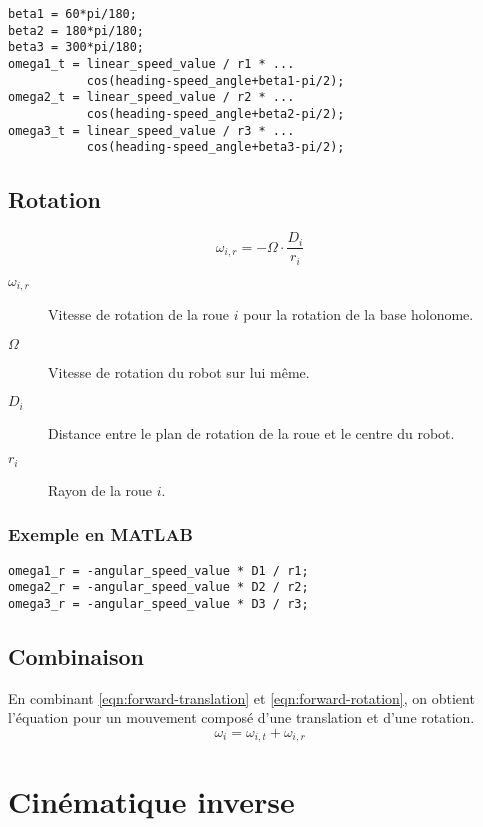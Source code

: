 \documentclass[a4paper]{paper}
\begin{document}
\begin{lstlisting}
beta1 = 60*pi/180;
beta2 = 180*pi/180;
beta3 = 300*pi/180;
omega1_t = linear_speed_value / r1 * ...
           cos(heading-speed_angle+beta1-pi/2);
omega2_t = linear_speed_value / r2 * ...
           cos(heading-speed_angle+beta2-pi/2);
omega3_t = linear_speed_value / r3 * ...
           cos(heading-speed_angle+beta3-pi/2);
\end{lstlisting}

\subsection{Rotation}
\begin{equation}
    \omega_{i, r} = - \Omega \cdot \frac{D_i}{r_i}
    \label{eqn:forward-rotation}
\end{equation}

\begin{description}
    \item[$\omega_{i,r}$] Vitesse de rotation de la roue $i$ pour la rotation de la base holonome.
    \item[$\Omega$] Vitesse de rotation du robot sur lui même.
    \item[$D_i$] Distance entre le plan de rotation de la roue et le centre du robot.
    \item[$r_i$] Rayon de la roue $i$.
\end{description}
\subsubsection{Exemple en MATLAB}
\begin{lstlisting}
omega1_r = -angular_speed_value * D1 / r1;
omega2_r = -angular_speed_value * D2 / r2;
omega3_r = -angular_speed_value * D3 / r3;
\end{lstlisting}

\subsection{Combinaison}
En combinant \eqref{eqn:forward-translation} et \eqref{eqn:forward-rotation}, on obtient l'équation
pour un mouvement composé d'une translation et d'une rotation.
\begin{equation}
    \omega_i = \omega_{i,t} + \omega_{i,r}
    \label{eqn-forward-complete}
\end{equation}
\section{Cinématique inverse}
\end{document}
